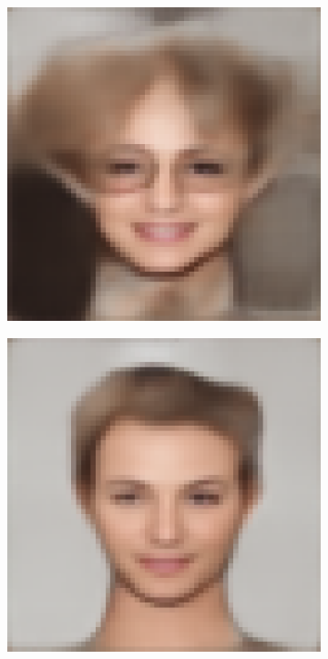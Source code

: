 \documentclass{IEEEcsmag}
\begin{document}
\begin{figure}[ht]
\begin{subfigure}{0.12\textwidth}
    \end{subfigure}
    \begin{subfigure}{0.12\textwidth}
        \includegraphics[width=\linewidth]{Digital sketches/generated_images/image8.jpeg_AE.png}
    \end{subfigure}
    \begin{subfigure}{0.12\textwidth}
        \includegraphics[width=\linewidth]{Digital sketches/generated_images/image11.jpeg_AE.png}

\end{subfigure}
\end{figure}
\end{document}
